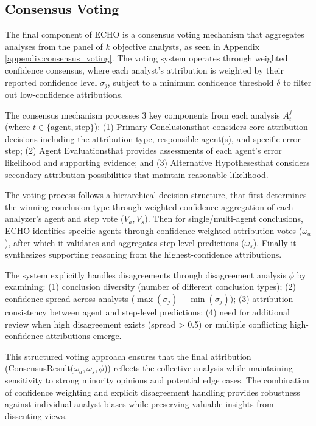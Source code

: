 \documentclass{article}
\begin{document}
\subsection{Consensus Voting}
The final component of ECHO is a consensus voting mechanism that aggregates analyses from the panel of $k$ objective analysts, as seen in Appendix \ref{appendix:consensus_voting}. The voting system operates through weighted confidence consensus, where each analyst's attribution is weighted by their reported confidence level $\sigma_j$, subject to a minimum confidence threshold $\delta$ to filter out low-confidence attributions.

The consensus mechanism processes 3 key components from each analysis $A_t^j$ (where $t \in \{\text{agent}, \text{step}\}$): (1) Primary Conclusions\textemdash that considers core attribution decisions including the attribution type, responsible agent(s), and specific error step; (2) Agent Evaluations\textemdash that provides assessments of each agent's error likelihood and supporting evidence; and (3) Alternative Hypotheses\textemdash that considers secondary attribution possibilities that maintain reasonable likelihood.

The voting process follows a hierarchical decision structure, that first determines the winning conclusion type through weighted confidence aggregation of each analyzer's agent and step vote ($V_a, V_s$). Then for single/multi-agent conclusions, ECHO identifies specific agents through confidence-weighted attribution votes ($\omega_a$), after which it validates and aggregates step-level predictions ($\omega_s$). Finally it synthesizes supporting reasoning from the highest-confidence attributions.

The system explicitly handles disagreements through disagreement analysis $\phi$ by examining: (1) conclusion diversity (number of different conclusion types); (2) confidence spread across analysts ($\max(\sigma_j) - \min(\sigma_j)$); (3) attribution consistency between agent and step-level predictions; (4) need for additional review when high disagreement exists (spread > 0.5) or multiple conflicting high-confidence attributions emerge.

This structured voting approach ensures that the final attribution (ConsensusResult($\omega_a, \omega_s, \phi$)) reflects the collective analysis while maintaining sensitivity to strong minority opinions and potential edge cases. The combination of confidence weighting and explicit disagreement handling provides robustness against individual analyst biases while preserving valuable insights from dissenting views.
\end{document}
